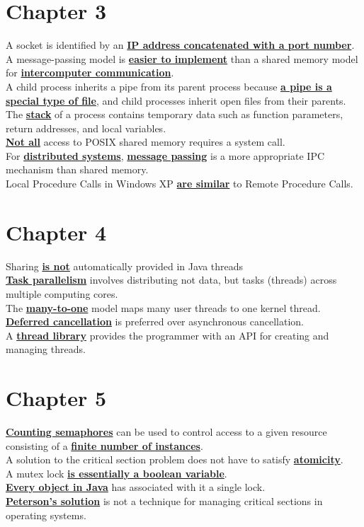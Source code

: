 \documentclass[10pt]{article}
\newcommand{\qw}[1]{\textbf{\ul{#1}}}
\begin{document}
\section*{\centering Chapter 3}
A socket is identified by an \qw{IP address concatenated with a port number}.\\[2mm]
A message-passing model is \qw{easier to implement} than a shared memory model for \qw{intercomputer communication}.\\[2mm]
A child process inherits a pipe from its parent process because \qw{a pipe is a special type of file}, and child processes inherit open files from their parents.\\[2mm]
The \qw{stack} of a process contains temporary data such as function parameters, return addresses, and local variables.\\[2mm]
\qw{Not all} access to POSIX shared memory requires a system call.\\[2mm]
For \qw{distributed systems}, \qw{message passing} is a more appropriate IPC mechanism than shared memory.\\[2mm]
Local Procedure Calls in Windows XP \qw{are similar} to Remote Procedure Calls.\\[2mm]
\newpage



\section*{\centering Chapter 4}
Sharing \qw{is not} automatically provided in Java threads\\[2mm]
\qw{Task parallelism} involves distributing not data, but tasks (threads) across multiple computing cores.\\[2mm]
The \qw{many-to-one} model maps many user threads to one kernel thread.\\[2mm]
\qw{Deferred cancellation} is preferred over asynchronous cancellation.\\[2mm]
A \qw{thread library} provides the programmer with an API for creating and managing threads.\\[2mm]
\newpage



\section*{\centering Chapter 5}
\qw{Counting semaphores} can be used to control access to a given resource consisting of a \qw{finite number of instances}.\\[2mm] 
A solution to the critical section problem does not have to satisfy \qw{atomicity}.\\[2mm]
A mutex lock \qw{is essentially a boolean variable}.\\[2mm]
\qw{Every object in Java} has associated with it a single lock.\\[2mm]
\qw{Peterson's solution} is not a technique for managing critical sections in operating systems.\\[2mm]
\newpage
\end{document}
